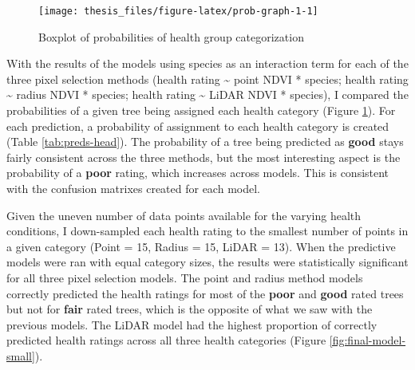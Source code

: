 \documentclass[12pt,twoside]{reedthesis}
\begin{document}
\begin{figure}[H]

{\centering \texttt{[image: thesis\_files/figure-latex/prob-graph-1-1]} 

}

\caption{Boxplot of probabilities of health group categorization}\label{fig:prob-graph-1}
\end{figure}
With the results of the models using species as an interaction term for
each of the three pixel selection methods (health rating \textasciitilde{} point NDVI
* species; health rating \textasciitilde{} radius NDVI * species; health rating \textasciitilde{}
LiDAR NDVI * species), I compared the probabilities of a given tree
being assigned each health category (Figure \ref{fig:prob-graph-1}).
For each prediction, a probability of assignment to each health category
is created (Table \ref{tab:preds-head}). The probability of a tree
being predicted as \textbf{good} stays fairly consistent across the three
methods, but the most interesting aspect is the probability of a
\textbf{poor} rating, which increases across models. This is consistent with
the confusion matrixes created for each model.

Given the uneven number of data points available for the varying health
conditions, I down-sampled each health rating to the smallest number of
points in a given category (Point = 15, Radius = 15, LiDAR = 13). When
the predictive models were ran with equal category sizes, the results
were statistically significant for all three pixel selection models. The
point and radius method models correctly predicted the health ratings
for most of the \textbf{poor} and \textbf{good} rated trees but not for \textbf{fair}
rated trees, which is the opposite of what we saw with the previous
models. The LiDAR model had the highest proportion of correctly
predicted health ratings across all three health categories (Figure
\ref{fig:final-model-small}).
\end{document}
